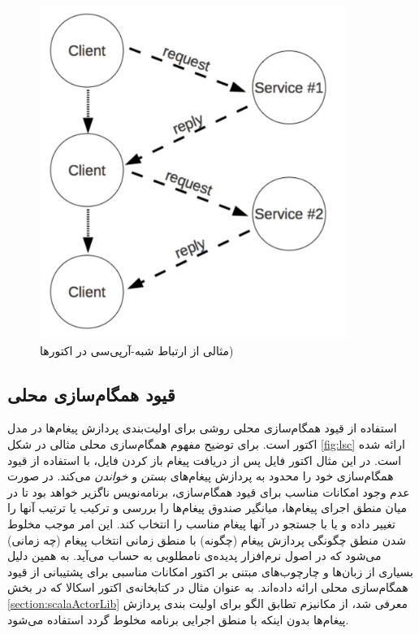 \begin{figure}
    \begin{center}
	\includegraphics[width=10cm]{3-RelatedWork/Figures/RPC.pdf}
    \end{center}
    \caption{\label{fig:rpc} مثالی از ارتباط شبه-آرپی‌سی در اکتورها) }
\end{figure}

\subsection{قیود همگام‌سازی محلی}
\label{subsec:local_sync_constraints}
استفاده از قیود همگام‌سازی محلی روشی برای اولیت‌بندی پردازش پیغام‌ها در مدل اکتور است\cite{FrolundCoord}. برای توضیح مفهوم همگام‌سازی محلی مثالی در شکل \ref{fig:lsc} ارائه شده است. در این مثال اکتور فایل پس از دریافت پیغام باز کردن فایل، با استفاده از قیود همگام‌سازی خود را محدود به پردازش پیغام‌های \textit{بستن} و \textit{خواندن} می‌کند. در صورت عدم وجود امکانات مناسب برای قیود همگام‌سازی، برنامه‌نویس ناگزیر خواهد بود تا در میان منطق اجرای پیغام‌ها، میانگیر صندوق پیغام‌ها را بررسی و ترکیب یا ترتیب آنها را تغییر داده و یا با جستجو در آنها پیغام مناسب را انتخاب کند. این امر موجب مخلوط شدن منطق چگونگی پردازش پیغام  (چگونه) با منطق زمانی انتخاب پیغام (چه زمانی) می‌شود که در اصول نرم‌افزار پدیده‌ی نامطلوبی به حساب می‌آید\cite{KarmaniAgha_Actors_11}. به همین دلیل بسیاری از زبان‌ها و چارچوب‌های مبتنی بر اکتور امکانات مناسبی برای پشتیبانی از قیود‌ همگام‌سازی محلی ارائه داده‌اند. به عنوان مثال در کتابخانه‌ی اکتور اسکالا که در بخش \ref{section:scalaActorLib} معرفی شد، از مکانیزم تطابق الگو برای اولیت بندی پردازش پیغام‌ها بدون اینکه با منطق اجرایی برنامه مخلوط گردد استفاده می‌شود.


